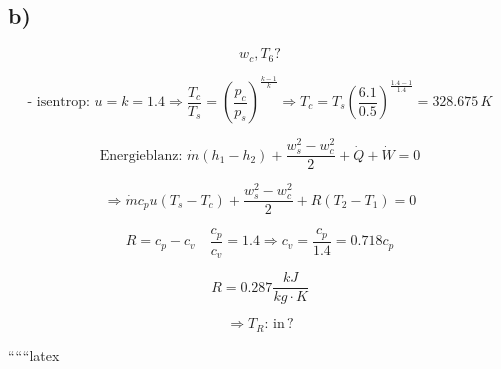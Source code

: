 

\subsection*{b)}

\[
w_c, T_6?
\]

\[
\text{- isentrop: } u = k = 1.4 \Rightarrow \frac{T_c}{T_s} = \left( \frac{p_c}{p_s} \right)^{\frac{k-1}{k}} \Rightarrow T_c = T_s \left( \frac{6.1}{0.5} \right)^{\frac{1.4-1}{1.4}} = 328.675 \, K
\]

\[
\text{Energieblanz: } \dot{m} (h_1 - h_2) + \frac{w_s^2 - w_c^2}{2} + \dot{Q} + \dot{W} = 0
\]

\[
\Rightarrow \dot{m} c_p u (T_s - T_c) + \frac{w_s^2 - w_c^2}{2} + R(T_2 - T_1) = 0
\]

\[
R = c_p - c_v \quad \frac{c_p}{c_v} = 1.4 \Rightarrow c_v = \frac{c_p}{1.4} = 0.718 c_p
\]

\[
R = 0.287 \frac{kJ}{kg \cdot K}
\]

\[
\Rightarrow T_R: \, \text{in} \, ?
\]

``````latex